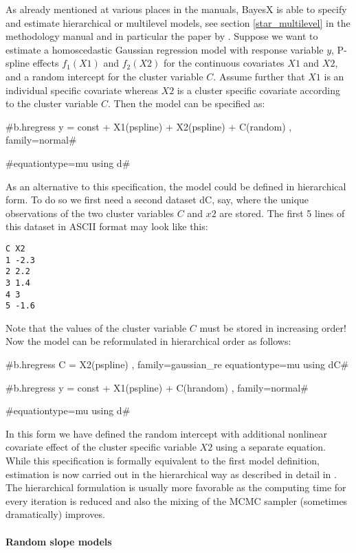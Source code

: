 $ $ \\

As already mentioned at various places in the manuals, BayesX is able to specify and estimate hierarchical or
multilevel models, see section \ref{star_multilevel} in the methodology manual and in particular the paper by
. Suppose we want to estimate a homoscedastic Gaussian regression model with response variable
$y$, P-spline effects $f_1(X1)$ and $f_2(X2)$ for the continuous covariates $X1$ and $X2$, and a random intercept for the
cluster variable $C$. Assume further that $X1$ is an individual specific covariate whereas $X2$ is a cluster specific covariate
according to the cluster variable $C$. Then the model can be specified as:

#b.hregress y = const + X1(pspline)  + X2(pspline) + C(random) , family=normal#

#equationtype=mu using d#

As an alternative to this specification, the model could be defined in hierarchical form. To do so we first need a second dataset dC, say,
where the unique observations of the two cluster variables $C$ and $x2$ are stored. The first 5 lines of this dataset in ASCII format may look like this:

\begin{verbatim}
C X2
1 -2.3
2 2.2
3 1.4
4 3
5 -1.6
\end{verbatim}

Note that the values of the cluster variable $C$ must be stored in increasing order! Now the model can be reformulated in hierarchical order as
follows:

#b.hregress C = X2(pspline) , family=gaussian_re equationtype=mu using dC#

#b.hregress y = const + X1(pspline)  + C(hrandom) , family=normal#

#equationtype=mu using d#

In this form we have defined the random intercept with additional nonlinear covariate effect of the cluster specific
variable $X2$ using a separate equation. While this specification is formally equivalent to the first
model definition, estimation is now carried out in the hierarchical way as described in detail in . The hierarchical
formulation is usually more favorable as the computing time for every iteration is reduced and also the mixing of the MCMC sampler (sometimes
dramatically) improves.

\paragraph{Random slope models}

